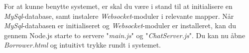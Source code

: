 For at kunne benytte systemet, er skal du være i stand til at initialisere en \textit{MySql}-database, samt instalere \textit{Websocket}-moduler i relevante mapper. Når  \textit{MySql}-databasen er initialiseret og \textit{Websocket}-moduler er installeret, kan du gennem Node.js starte to servere "\textit{main.js}" og "\textit{ChatServer.js}". Du kan nu åbne \textit{Borrower.html} og intuitivt trykke rundt i systemet.